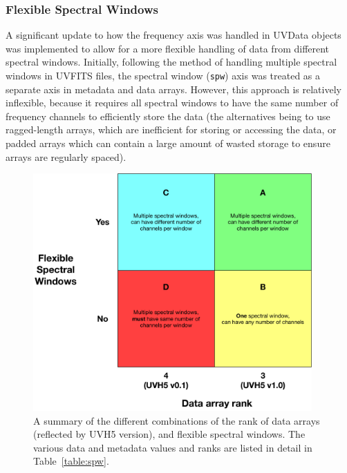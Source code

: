 \documentclass[11pt, oneside]{article}
\begin{document}
\subsubsection{Flexible Spectral Windows}
\label{sec:flex_spw}
A significant update to how the frequency axis was handled in UVData objects was
implemented to allow for a more flexible handling of data from different
spectral windows. Initially, following the method of handling multiple spectral
windows in UVFITS files, the spectral window (\verb+spw+) axis was treated as a
separate axis in metadata and data arrays. However, this approach is relatively
inflexible, because it requires all spectral windows to have the same number of
frequency channels to efficiently store the data (the alternatives being to use
ragged-length arrays, which are inefficient for storing or accessing the data,
or padded arrays which can contain a large amount of wasted storage to ensure
arrays are regularly spaced).

\begin{figure}[h!]
  \begin{center}
    \includegraphics[width=0.95\textwidth]{uvh5_diagram.pdf}
    \caption{A summary of the different combinations of the rank of data arrays
      (reflected by UVH5 version), and flexible spectral windows. The various
      data and metadata values and ranks are listed in detail in
      Table~\ref{table:spw}.}
    \label{fig:spws}
  \end{center}
\end{figure}
\end{document}

